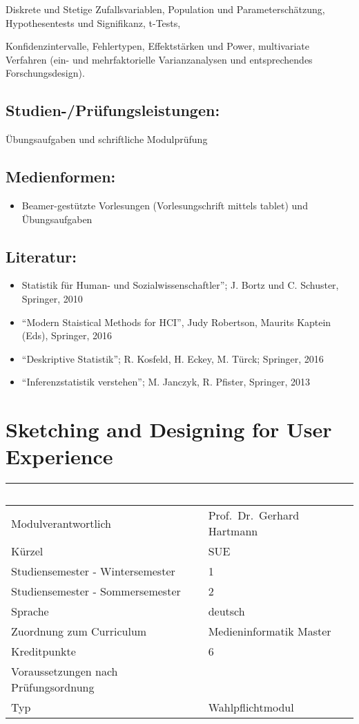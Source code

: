 Diskrete und Stetige Zufallsvariablen, Population und
Parameterschätzung, Hypothesentests und Signifikanz, t-Tests,

Konfidenzintervalle, Fehlertypen, Effektstärken und Power, multivariate
Verfahren (ein- und mehrfaktorielle Varianzanalysen und entsprechendes
Forschungsdesign).

\section*{Studien-/Prüfungsleistungen:}\label{studien-pruxfcfungsleistungen-12}

Übungsaufgaben und schriftliche Modulprüfung

\section*{Medienformen:}\label{medienformen-12}

\begin{itemize}
\tightlist
\item
  Beamer-gestützte Vorlesungen (Vorlesungschrift mittels tablet) und
  Übungsaufgaben
\end{itemize}

\section*{Literatur:}\label{literatur-12}

\begin{itemize}
\item
  Statistik für Human- und Sozialwissenschaftler''; J. Bortz und C.
  Schuster, Springer, 2010
\item
  ``Modern Staistical Methods for HCI'', Judy Robertson, Maurits Kaptein
  (Eds), Springer, 2016
\item
  ``Deskriptive Statistik''; R. Kosfeld, H. Eckey, M. Türck; Springer,
  2016
\item
  ``Inferenzstatistik verstehen''; M. Janczyk, R. Pfister, Springer,
  2013
\end{itemize}

\chapter{Sketching and Designing for User
Experience}\label{sketching-and-designing-for-user-experience}

\begin{longtable}[]{@{}ll@{}}
\toprule
~ & ~\tabularnewline
\midrule
\endhead
Modulverantwortlich & Prof.~Dr.~Gerhard Hartmann\tabularnewline
Kürzel & SUE\tabularnewline
Studiensemester - Wintersemester & 1\tabularnewline
Studiensemester - Sommersemester & 2\tabularnewline
Sprache & deutsch\tabularnewline
Zuordnung zum Curriculum & Medieninformatik Master\tabularnewline
Kreditpunkte & 6\tabularnewline
Voraussetzungen nach Prüfungsordnung &\tabularnewline
Typ & Wahlpflichtmodul\tabularnewline
\bottomrule
\end{longtable}

